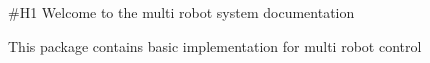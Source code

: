 \#\+H1 Welcome to the multi robot system documentation

This package contains basic implementation for multi robot control 